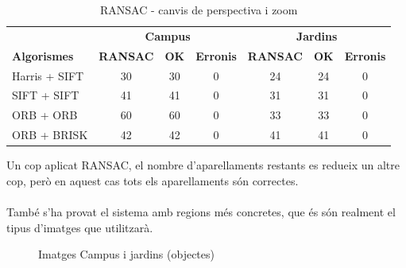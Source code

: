 		\begin{table}[H]
			\begin{center}
				\begin{tabular}{l | c c c | c c c}
					& \multicolumn{3}{c|}{\textbf{Campus}} & \multicolumn{3}{c}{\textbf{Jardins}} \\
					\textbf{Algorismes} & \textbf{RANSAC} & \textbf{OK} & \textbf{Erronis} & \textbf{RANSAC} & \textbf{OK} & \textbf{Erronis} \\ \hline
					Harris + SIFT & 30 & 30 & 0 & 24 & 24 & 0 \\
					SIFT + SIFT & 41 & 41 & 0 & 31 & 31 & 0 \\
					ORB + ORB & 60 & 60 & 0 & 33 & 33 & 0 \\
					ORB + BRISK & 42 & 42 & 0 & 41 & 41 & 0 \\
				\end{tabular}
			\end{center}
			\caption{RANSAC - canvis de perspectiva i zoom}
		\end{table}
		\noindent
		Un cop aplicat RANSAC, el nombre d'aparellaments restants es redueix un altre cop, però en aquest cas tots els aparellaments són correctes.\\\\
		També s'ha provat el sistema amb regions més concretes, que és són realment el tipus d'imatges que utilitzarà.\\

		\begin{figure}[!htb]
			\caption{Imatges Campus i jardins (objectes)}
		\end{figure}

